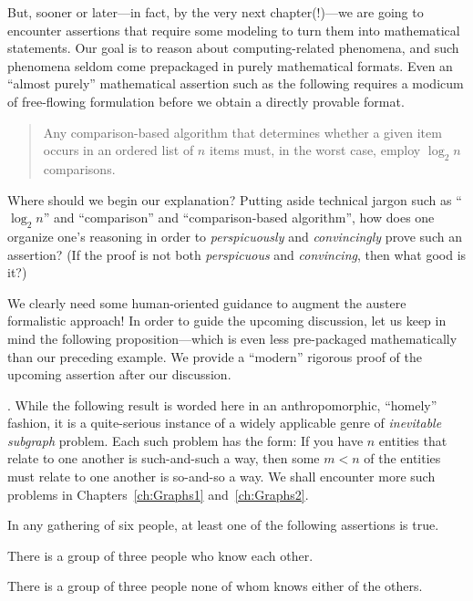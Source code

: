 But, sooner or later---in fact, by the very next chapter(!)---we are going to encounter assertions that require some modeling to turn them into mathematical statements.  Our goal is to reason about computing-related phenomena, and such phenomena seldom come prepackaged in purely mathematical formats.  Even an ``almost purely'' mathematical assertion such as the following requires a modicum of free-flowing formulation before we obtain a directly provable format.
\begin{quote}
Any comparison-based algorithm that determines whether a given item occurs in an ordered list of $n$ items must, in the worst case, employ $\log_2 n$ comparisons.
\end{quote}
Where should we begin our explanation?  Putting aside technical jargon such as ``$\log_2 n$'' and ``comparison'' and ``comparison-based algorithm'', how does one organize one's reasoning in order to {\em perspicuously} and {\em convincingly} prove such an assertion?  (If the proof is not both  {\em perspicuous} and {\em convincing}, then what good is it?)

We clearly need some human-oriented guidance to augment the austere formalistic approach!  In order to guide the upcoming discussion, let us keep in mind the following proposition---which is even less pre-packaged mathematically than our preceding example.  We provide a ``modern'' rigorous proof of the upcoming assertion after our discussion.

\medskip

.
While the following result is worded here in an anthropomorphic, ``homely'' fashion, it is a quite-serious instance of a widely applicable genre of {\it inevitable subgraph} problem.  Each such problem has the form: If you have $n$ entities that relate to one another is such-and-such a
way, then some $m < n$ of the entities must relate to one another is so-and-so a way.  We shall encounter more such problems in Chapters~\ref{ch:Graphs1} and~\ref{ch:Graphs2}.

\begin{prop}
\label{thm:triangle-cotriangles}
In any gathering of six people, at least one of the following assertions is true.

There is a group of three people who know each other.

There is a group of three people none of whom knows either of the others.
\end{prop}

